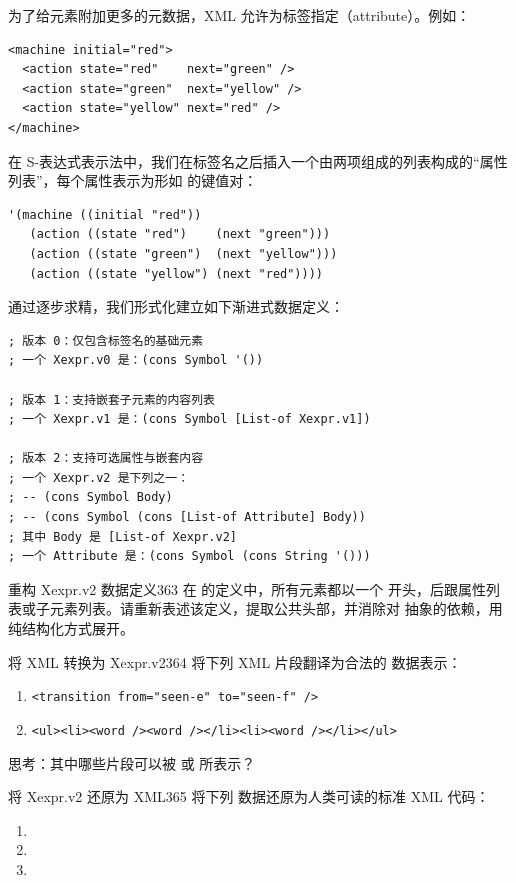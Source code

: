 为了给元素附加更多的元数据，XML 允许为标签指定（attribute）。例如：
\begin{lstlisting}[language=BSL]
<machine initial="red">
  <action state="red"    next="green" />
  <action state="green"  next="yellow" />
  <action state="yellow" next="red" />
</machine>
\end{lstlisting}

在 S-表达式表示法中，我们在标签名之后插入一个由两项组成的列表构成的“属性列表”，每个属性表示为形如  的键值对：
\begin{lstlisting}[language=BSL]
'(machine ((initial "red"))
   (action ((state "red")    (next "green")))
   (action ((state "green")  (next "yellow")))
   (action ((state "yellow") (next "red"))))
\end{lstlisting}

通过逐步求精，我们形式化建立如下渐进式数据定义：

\begin{lstlisting}[language=BSL]
; 版本 0：仅包含标签名的基础元素
; 一个 Xexpr.v0 是：(cons Symbol '())

; 版本 1：支持嵌套子元素的内容列表
; 一个 Xexpr.v1 是：(cons Symbol [List-of Xexpr.v1])

; 版本 2：支持可选属性与嵌套内容
; 一个 Xexpr.v2 是下列之一：
; -- (cons Symbol Body)
; -- (cons Symbol (cons [List-of Attribute] Body))
; 其中 Body 是 [List-of Xexpr.v2]
; 一个 Attribute 是：(cons Symbol (cons String '()))
\end{lstlisting}

\begin{exercise}{重构 Xexpr.v2 数据定义}{363}
在  的定义中，所有元素都以一个  开头，后跟属性列表或子元素列表。请重新表述该定义，提取公共头部，并消除对  抽象的依赖，用纯结构化方式展开。
\end{exercise}

\begin{exercise}{将 XML 转换为 Xexpr.v2}{364}
将下列 XML 片段翻译为合法的  数据表示：
\begin{enumerate}
  \item \verb|<transition from="seen-e" to="seen-f" />|
  \item \verb|<ul><li><word /><word /></li><li><word /></li></ul>|
\end{enumerate}
思考：其中哪些片段可以被  或  所表示？
\end{exercise}

\begin{exercise}{将 Xexpr.v2 还原为 XML}{365}
将下列  数据还原为人类可读的标准 XML 代码：
\begin{enumerate}
  \item {}
  \item {}
  \item {}
\end{enumerate}
\end{exercise}

